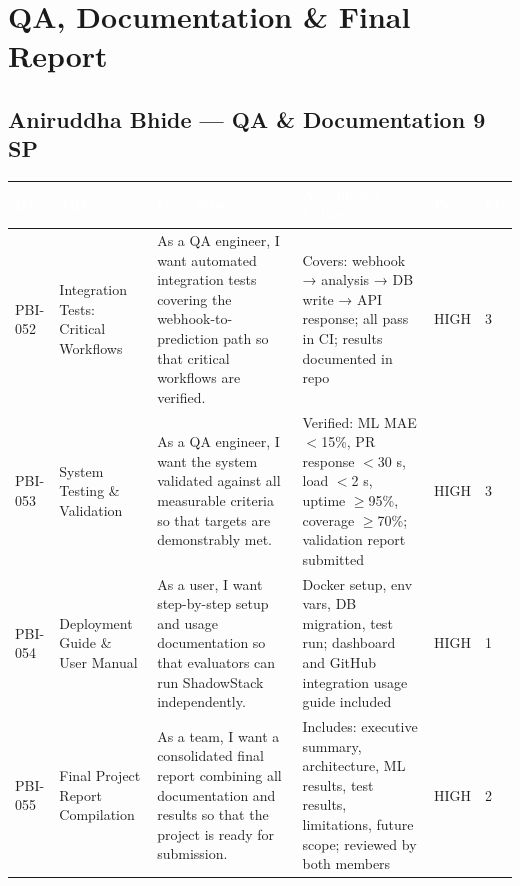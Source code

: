 \documentclass[10pt,a4paper]{article}
\begin{document}
\vspace{0.8em}

\section{QA, Documentation \& Final Report}

\subsection*{Aniruddha Bhide — QA \& Documentation \hfill 9 SP}

\renewcommand{\arraystretch}{1.45}
\begin{tabularx}{\textwidth}{|L{1.5cm}|L{3cm}|X|L{3cm}|L{1cm}|L{0.6cm}|}
\hline
{}
\textcolor{white}{\textbf{ID}} &
\textcolor{white}{\textbf{Title}} &
\textcolor{white}{\textbf{User Story}} &
\textcolor{white}{\textbf{Acceptance Criteria}} &
\textcolor{white}{\textbf{Pri.}} &
\textcolor{white}{\textbf{SP}} \\ \hline

PBI-052 &
Integration Tests: Critical Workflows &
As a QA engineer, I want automated integration tests covering the webhook-to-prediction path so that critical workflows are verified. &
Covers: webhook → analysis → DB write → API response; all pass in CI; results documented in repo &
HIGH & 3 \\ \hline

PBI-053 &
System Testing \& Validation &
As a QA engineer, I want the system validated against all measurable criteria so that targets are demonstrably met. &
Verified: ML MAE $<$15\%, PR response $<$30 s, load $<$2 s, uptime $\geq$95\%, coverage $\geq$70\%; validation report submitted &
HIGH & 3 \\ \hline

PBI-054 &
Deployment Guide \& User Manual &
As a user, I want step-by-step setup and usage documentation so that evaluators can run ShadowStack independently. &
Docker setup, env vars, DB migration, test run; dashboard and GitHub integration usage guide included &
HIGH & 1 \\ \hline

PBI-055 &
Final Project Report Compilation &
As a team, I want a consolidated final report combining all documentation and results so that the project is ready for submission. &
Includes: executive summary, architecture, ML results, test results, limitations, future scope; reviewed by both members &
HIGH & 2 \\ \hline

\end{tabularx}
\end{document}
